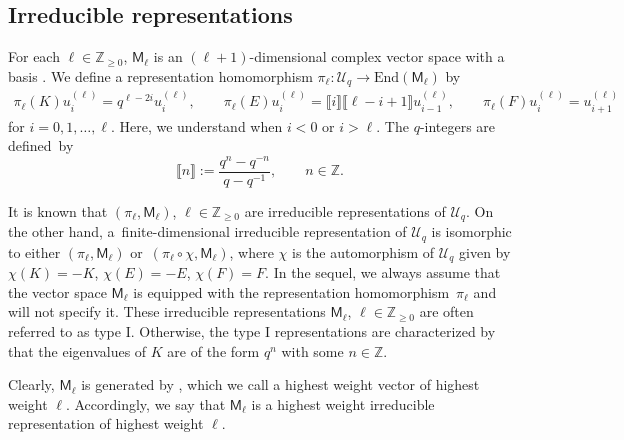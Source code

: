 \documentclass[pdftex]{sigma}
\numberwithin{equation}{section}
\newcommand{\End}{\mathrm{End}}
\newcommand{\bZ}{\mathbb{Z}}
\newcommand{\cU}{\mathcal{U}}
\newcommand{\sfM}{\mathsf{M}}
\newcommand{\qint}[1]{\llbracket #1 \rrbracket}
\newcommand{\UEA}{\cU}
\newcommand{\Uq}{\UEA_{q}}
\newcommand{\QGirrep}[1]{\sfM_{#1}}
\newcommand{\QGirvec}[2]{u^{(#1)}_{#2}}
\newcommand{\QGirmap}[1]{\pi_{#1}}
\begin{document}
\subsection{Irreducible representations}
For each $\ell\in \bZ_{\geq 0}$, $\QGirrep{\ell}$ is an $(\ell+1)$-dimensional complex vector space with a basis \smash{$\big(\QGirvec{\ell}{i}\big)_{i=0,1,\dots, \ell}$}.
We define a representation homomorphism
$
 \QGirmap{\ell}\colon \Uq\to \End (\QGirrep{\ell})
$
by
\begin{gather*}
 \QGirmap{\ell} (K) \QGirvec{\ell}{i} =q^{\ell-2i}\QGirvec{\ell}{i}, \qquad
 \QGirmap{\ell}(E) \QGirvec{\ell}{i} = \qint{i}\qint{\ell-i+1} \QGirvec{\ell}{i-1},\qquad
 \QGirmap{\ell} (F) \QGirvec{\ell}{i} = \QGirvec{\ell}{i+1}
\end{gather*}
for $i=0,1,\dots,\ell$.
Here, we understand \smash{$\QGirvec{\ell}{i}=0$} when $i<0$ or $i>\ell$.
The $q$-integers are defined~by
\[
 \qint{n}:=\frac{q^{n}-q^{-n}}{q-q^{-1}}, \qquad n\in \bZ.
\]

It is known that $(\QGirmap{\ell},\QGirrep{\ell})$, $\ell\in \bZ_{\geq 0}$ are irreducible representations of $\Uq$.
On the other hand, a~finite-dimensional irreducible representation of $\Uq$ is isomorphic to either $(\QGirmap{\ell},\QGirrep{\ell})$ or~${(\QGirmap{\ell}\circ\chi,\QGirrep{\ell})}$, where $\chi$ is the automorphism of $\Uq$ given by $\chi (K)=-K$, $\chi (E)=-E$, $\chi (F)=F$.
In the sequel, we always assume that the vector space $\QGirrep{\ell}$ is equipped with the representation homomorphism~$\QGirmap{\ell}$ and will not specify it. These irreducible representations $\QGirrep{\ell}$, $\ell\in\bZ_{\geq 0}$ are often referred to as type I.
Otherwise, the type I representations are characterized by that the eigenvalues of $K$ are of the form $q^{n}$ with some $n\in\bZ$.

Clearly, $\QGirrep{\ell}$ is generated by \smash{$\QGirvec{\ell}{0}$}, which we call a highest weight vector of highest weight $\ell$.
Accordingly, we say that $\QGirrep{\ell}$ is a highest weight irreducible representation of highest weight $\ell$.
\end{document}
